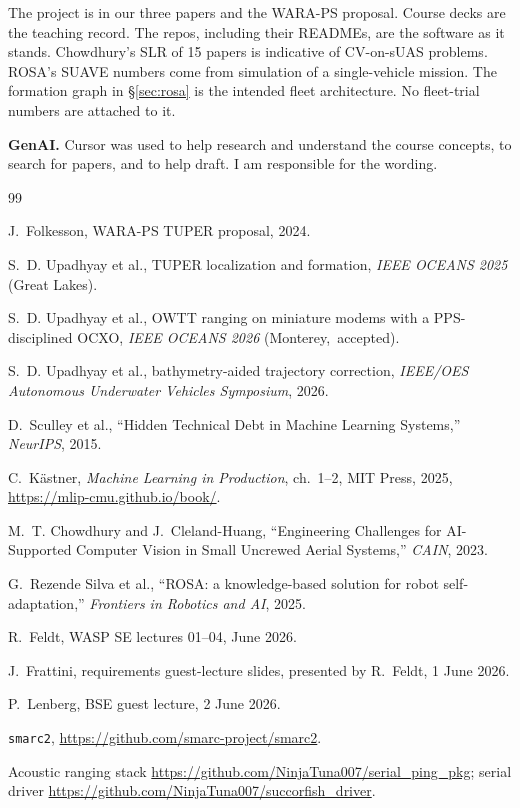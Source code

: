\documentclass[11pt,a4paper,twocolumn]{amsart}
\begin{document}
The project is in our three papers and the WARA-PS proposal. Course decks are the teaching record. The repos, including their READMEs, are the software as it stands. Chowdhury's SLR of 15 papers is indicative of CV-on-sUAS problems. ROSA's SUAVE numbers come from simulation of a single-vehicle mission. The formation graph in \S\ref{sec:rosa} is the intended fleet architecture. No fleet-trial numbers are attached to it.

\textbf{GenAI.} Cursor was used to help research and understand the course concepts, to search for papers, and to help draft. I am responsible for the wording.

\begin{thebibliography}{99}
\raggedright
\sloppy
{}
J.~Folkesson, WARA-PS TUPER proposal, 2024.

S.~D. Upadhyay et al., TUPER localization and formation, \emph{IEEE OCEANS 2025} (Great Lakes).

S.~D. Upadhyay et al., OWTT ranging on miniature modems with a PPS-disciplined OCXO, \emph{IEEE OCEANS 2026} \mbox{(Monterey, accepted)}.

S.~D. Upadhyay et al., bathymetry-aided trajectory correction, \emph{IEEE/OES Autonomous Underwater Vehicles Symposium}, 2026.

D.~Sculley et al., ``Hidden Technical Debt in Machine Learning Systems,'' \emph{NeurIPS}, 2015.

C.~K\"{a}stner, \emph{Machine Learning in Production}, ch.~1--2, MIT Press, 2025, \url{https://mlip-cmu.github.io/book/}.

M.~T. Chowdhury and J.~Cleland-Huang, ``Engineering Challenges for AI-Supported Computer Vision in Small Uncrewed Aerial Systems,'' \emph{CAIN}, 2023.

G.~Rezende Silva et al., ``ROSA: a knowledge-based solution for robot self-adaptation,'' \emph{Frontiers in Robotics and AI}, 2025.

R.~Feldt, WASP SE lectures 01--04, June 2026.

J.~Frattini, requirements guest-lecture slides, presented by R.~Feldt, 1 June 2026.

P.~Lenberg, BSE guest lecture, 2 June 2026.

\texttt{smarc2}, \url{https://github.com/smarc-project/smarc2}.

Acoustic ranging stack \url{https://github.com/NinjaTuna007/serial_ping_pkg}; serial driver \url{https://github.com/NinjaTuna007/succorfish_driver}.
\end{thebibliography}
\end{document}
